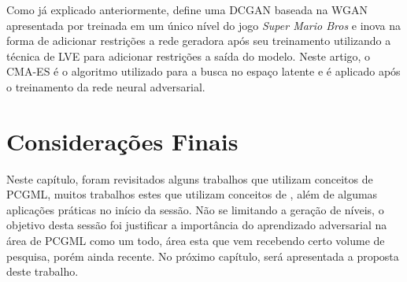 Como já explicado anteriormente, \cite{marioGAN} define uma DCGAN baseada na WGAN apresentada por \cite{wgan} treinada em um único nível do jogo \emph{Super Mario Bros} e inova na forma de adicionar restrições a rede geradora após seu treinamento utilizando a técnica de LVE para adicionar restrições a saída do modelo. Neste artigo, o CMA-ES é o algoritmo utilizado para a busca no espaço latente e é aplicado após o treinamento da rede neural adversarial.


\section{Considerações Finais}

Neste capítulo, foram revisitados alguns trabalhos que utilizam conceitos de PCGML, muitos trabalhos estes que utilizam conceitos de \cite{marioGAN}, além de algumas aplicações práticas no início da sessão. Não se limitando a geração de níveis, o objetivo desta sessão foi justificar a importância do aprendizado adversarial na área de PCGML como um todo, área esta que vem recebendo certo volume de pesquisa, porém ainda recente. No próximo capítulo, será apresentada a proposta deste trabalho. 

